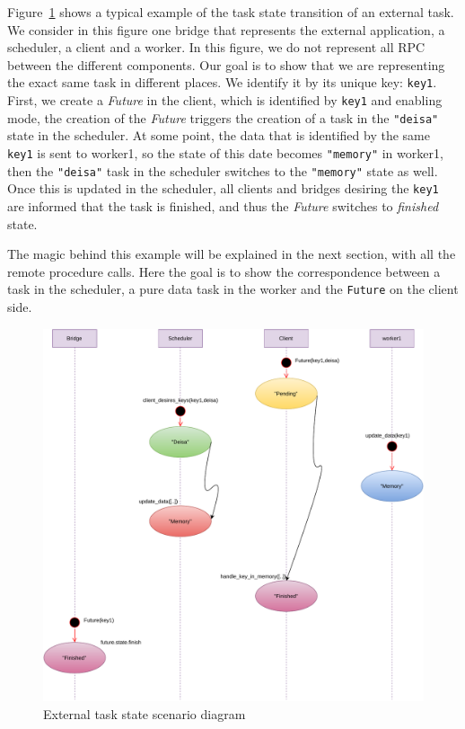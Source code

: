 Figure~\ref{figscatterStates} shows a typical example of the task state transition of an external task. We consider in this figure one bridge that represents the external application, a \dask scheduler, a client and a worker.
In this figure, we do not represent all RPC between the different components. Our goal is to show that we are representing the exact same task in different places. We identify it by its unique key: \texttt{key1}. First, we create a \textit{Future} in the client, which is identified by \texttt{key1} and enabling \deisa mode, the creation of the \textit{Future} triggers the creation of a task in the \texttt{"deisa"} state in the scheduler. At some point, the data that is identified by the same \texttt{key1} is sent to worker1, so the state of this date becomes \texttt{"memory"} in worker1, then the \texttt{"deisa"} task in the scheduler switches to the \texttt{"memory"} state as well. Once this is updated in the scheduler, all clients and bridges desiring the \texttt{key1} are informed that the task is finished, and thus the \textit{Future} switches to \textit{finished} state. 

The magic behind this example will be explained in the next section, with all the remote procedure calls. Here the goal is to show the correspondence between a task in the scheduler, a pure data task in the worker and the \texttt{Future} on the client side. 

\begin{figure}\centering
\includegraphics[scale=0.65]{figures/NewSacatterAutomateexample.pdf}
\caption{External task state scenario diagram}
\label{figscatterStates}
\end{figure}


